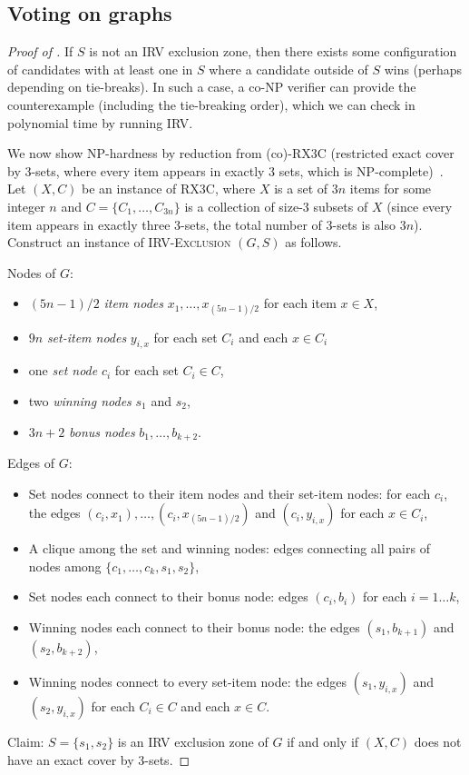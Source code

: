 \documentclass{article}
\theoremstyle{theorem}
\theoremstyle{definition}
\begin{document}
\subsection{Voting on graphs}


\begin{proof}[Proof of ]
  If $S$ is not an IRV exclusion zone, then there exists some configuration of candidates with at least one in $S$ where a candidate outside of $S$ wins (perhaps depending on tie-breaks). In such a case, a co-NP verifier can provide the counterexample (including the tie-breaking order), which we can check in polynomial time by running IRV.
  
  We now show NP-hardness by reduction from (co)-RX3C (restricted exact cover by 3-sets, where every item appears in exactly 3 sets, which is NP-complete)~\cite{gonzalez1985clustering}. Let $(X, C)$ be an instance of RX3C, where $X$ is a set of $3n$ items for some integer $n$ and $C = \{C_1, \dots, C_{3n}\}$ is a collection of size-3 subsets of $X$ (since every item appears in exactly three 3-sets, the total number of 3-sets is also $3n$). 
   Construct an instance of \textsc{IRV-Exclusion} $(G, S)$ as follows.
  
  Nodes of $G$:
  \begin{itemize}
    \item $(5n-1)/2$ \emph{item nodes} $x_1, \dots, x_{(5n-1)/2}$ for each item $x \in X$,
    \item $9n$ \emph{set-item nodes} $y_{i, x}$ for each set $C_i$ and each $x \in C_i$
    \item one \emph{set node} $c_i$ for each set $C_i \in C$,
    \item two \emph{winning nodes} $s_1$ and $s_2$,
    \item $3n+2$ \emph{bonus nodes} $b_1, \dots, b_{k+2}$.
  \end{itemize}
  
  Edges of $G$:
  \begin{itemize}
    \item Set nodes connect to their item nodes and their set-item nodes: for each $c_i$, the edges $(c_i, x_1), \dots, (c_i, x_{(5n-1)/2})$ and $(c_i, y_{i, x})$ for each $x \in C_i$,
    \item A clique among the set and winning nodes: edges connecting all pairs of nodes among $\{c_1, \dots, c_k, s_1, s_2\}$,
    \item Set nodes each connect to their bonus node: edges $(c_i, b_i)$ for each $i = 1\dots k$,
    \item Winning nodes each connect to their bonus node: the edges $(s_1, b_{k+1})$ and $(s_2, b_{k+2})$,
    \item Winning nodes connect to every set-item node: the edges $(s_1, y_{i, x})$ and $(s_2, y_{i, x})$ for each $C_i\in C$ and each $x \in C$.
  \end{itemize}  
  Claim: $S = \{s_1, s_2\}$ is an IRV exclusion zone of $G$ if and only if $(X, C)$ does not have an exact cover by 3-sets.
  

\end{proof}
\end{document}
